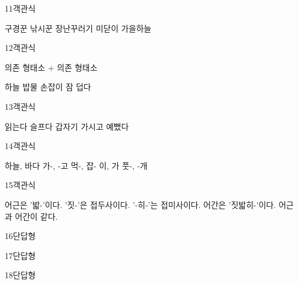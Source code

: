\documentclass[fs9,seriesRus]{korfarm-base}
\begin{document}
\begin{kfQBlock}{11}{객관식}
\begin{kfChoices}
\kfChoice 구경꾼
\kfChoice 낚시꾼
\kfChoice 장난꾸러기
\kfChoice 미닫이
\kfChoice 가을하늘
\end{kfChoices}
\end{kfQBlock}
\begin{kfQBlock}{12}{객관식}
\begin{kfEvidence}의존 형태소 + 의존 형태소\end{kfEvidence}
\begin{kfChoices}
\kfChoice 하늘
\kfChoice 밥물
\kfChoice 손잡이
\kfChoice 잠
\kfChoice 덥다
\end{kfChoices}
\end{kfQBlock}
\begin{kfQBlock}{13}{객관식}
\begin{kfChoices}
\kfChoice 읽는다
\kfChoice 슬프다
\kfChoice 갑자기
\kfChoice 가시고
\kfChoice 예뻤다
\end{kfChoices}
\end{kfQBlock}
\begin{kfQBlock}{14}{객관식}
\begin{kfChoices}
\kfChoice 하늘, 바다
\kfChoice 가-, -고
\kfChoice 먹-, 잡-
\kfChoice 이, 가
\kfChoice 풋-, -개
\end{kfChoices}
\end{kfQBlock}
\begin{kfQBlock}{15}{객관식}
\begin{kfChoices}
\kfChoice 어근은 '밟-'이다.
\kfChoice '짓-'은 접두사이다.
\kfChoice '-히-'는 접미사이다.
\kfChoice 어간은 '짓밟히-'이다.
\kfChoice 어근과 어간이 같다.
\end{kfChoices}
\end{kfQBlock}
\begin{kfQBlock}{16}{단답형}
\end{kfQBlock}
\begin{kfQBlock}{17}{단답형}
\end{kfQBlock}
\begin{kfQBlock}{18}{단답형}
\end{kfQBlock}
\end{document}
